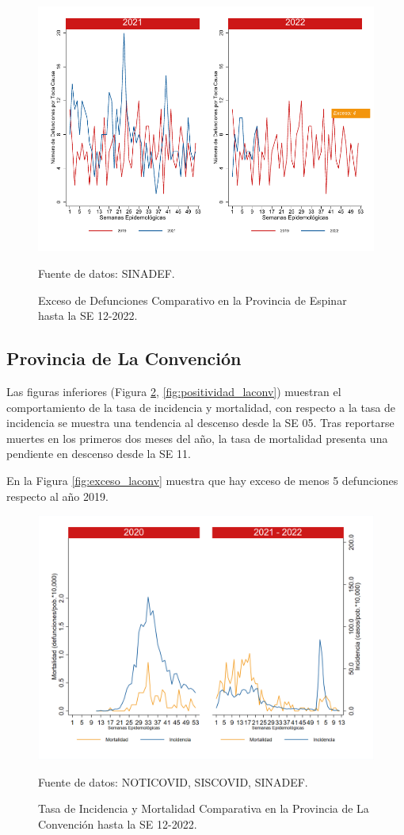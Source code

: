 \documentclass[12pt,a4paper,openany]{book}
\begin{document}
		\begin{figure}[h]
			\caption{Exceso de Defunciones Comparativo en la Provincia de Espinar hasta la SE 12-2022.}\label{fig:exceso_espinar}
			\begin{center}
				\includegraphics[width=0.7\linewidth]{../figuras/exceso_8.pdf}
			\end{center}
			{\footnotesize {Fuente de datos: SINADEF.}}
		\end{figure}
		
		\clearpage
		
		\subsection*{Provincia de La Convención}
		\noindent Las figuras inferiores (Figura \ref{fig:inc_mort_laconv}, \ref{fig:positividad_laconv}) muestran el comportamiento de la tasa de incidencia y mortalidad, con respecto a la tasa de incidencia se muestra una tendencia al descenso desde la SE 05. Tras reportarse muertes en los primeros dos meses del año, la tasa de mortalidad presenta una pendiente en descenso desde la SE 11. 
	
	En la Figura \ref{fig:exceso_laconv}  muestra que hay exceso de menos 5 defunciones respecto al año 2019.     
	
		\begin{figure}[h]
			\caption{Tasa de Incidencia y Mortalidad Comparativa en la Provincia de La Convención hasta la SE 12-2022.}\label{fig:inc_mort_laconv}
			\begin{center}
				\includegraphics[width=0.85\linewidth]{../figuras/incidencia_mortalidad_20_21_9.png}
			\end{center}
			{\footnotesize {Fuente de datos: NOTICOVID, SISCOVID, SINADEF.}}
		\end{figure}
		
\end{document}

